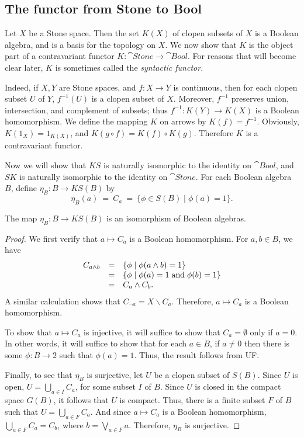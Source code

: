 \subsection*{The functor from Stone to Bool}

Let $X$ be a Stone space.  Then the set $K(X)$ of clopen subsets of
$X$ is a Boolean algebra, and is a basis for the topology on $X$.  We
now show that $K$ is the object part of a contravariant functor
$K:\cat{Stone}\to\cat{Bool}$.  For reasons that will become clear
later, $K$ is sometimes called the \emph{syntactic functor}.

Indeed, if $X,Y$ are Stone spaces, and $f:X\to Y$ is continuous, then
for each clopen subset $U$ of $Y$, $f^{-1}(U)$ is a clopen subset of
$X$.  Moreover, $f^{-1}$ preserves union, intersection, and complement
of subsets; thus $f^{-1}:K(Y)\to K(X)$ is a Boolean homomorphism.  We
define the mapping $K$ on arrows by $K(f)=f^{-1}$.  Obviously,
$K(1_X)=1_{K(X)}$, and $K(g\circ f)=K(f)\circ K(g)$.  Therefore $K$ is
a contravariant functor.

Now we will show that $KS$ is naturally isomorphic to the identity on
$\cat{Bool}$, and $SK$ is naturally isomorphic to the identity on
$\cat{Stone}$.  For each Boolean algebra $B$, define $\eta _B:B\to
KS(B)$ by
\[ \eta _B(a) \: = \: C_a \: = \: \{ \phi \in S(B) \mid \phi (a)=1 \}
.\]

\begin{lemma} The map $\eta _B:B\to KS(B)$ is an isomorphism of
  Boolean algebras.  \end{lemma}

\begin{proof} We first verify that $a\mapsto C_a$ is a Boolean
  homomorphism.  For $a,b\in B$, we have
  \[ \begin{array}{l l l}  C_{a\wedge b} & = & \{ \phi \mid \phi (a\wedge b)=1 \} \\
    & = & \{ \phi \mid \phi(a)=1\;\text{and}\; \phi(b) =1
    \} \\
    & = & C_a\wedge C_b . \end{array} \] A similar calculation shows
  that $C_{\neg a}=X\backslash C_a$.  Therefore, $a\mapsto C_a$ is a
  Boolean homomorphism.

  To show that $a\mapsto C_a$ is injective, it will suffice to show
  that $C_a=\emptyset$ only if $a=0$.  In other words, it will suffice
  to show that for each $a\in B$, if $a\neq 0$ then there is some
  $\phi :B\to 2$ such that $\phi (a)=1$.  Thus, the result follows
  from UF.

  Finally, to see that $\eta _B$ is surjective, let $U$ be a clopen
  subset of $S(B)$.  Since $U$ is open, $U=\bigcup _{a\in I}C_a$, for
  some subset $I$ of $B$.  Since $U$ is closed in the compact space
  $G(B)$, it follows that $U$ is compact.  Thus, there is a finite
  subset $F$ of $B$ such that $U=\bigcup _{a\in F}C_a$.  And since
  $a\mapsto C_a$ is a Boolean homomorphism, $\bigcup _{a\in
    F}C_a=C_b$, where $b=\bigvee _{a\in F}a$.  Therefore, $\eta _B$ is
  surjective.
\end{proof}


